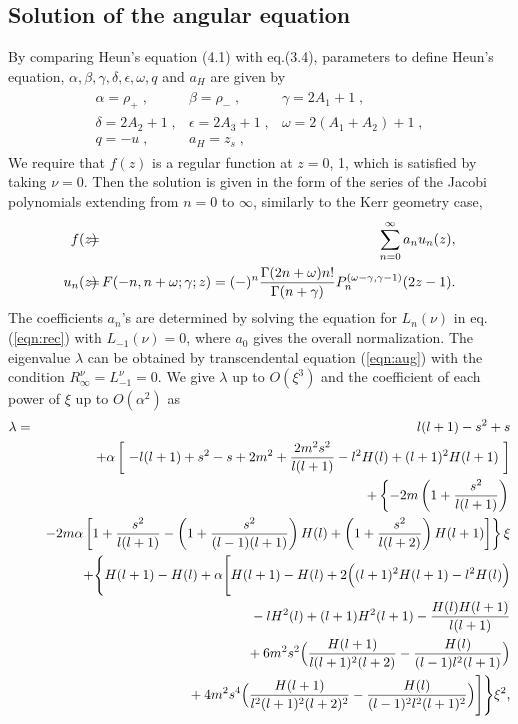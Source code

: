 \subsection{Solution of the angular equation} 
By comparing Heun's equation (4.1) with eq.(3.4), parameters to 
define Heun's equation, $\alpha, \beta, \gamma, 
\delta, \epsilon, \omega,  q$ and $a_H$ are given by
%
\begin{eqnarray}
\label{eqn:Sexp}
\begin{array}{lll}
\alpha=\rho_+\;,  & \beta=\rho_-\;,&\gamma=2A_1+1\;,   \\
 \delta = 2A_2+1\;, & \epsilon = 2A_3+1\;, &\omega=2(A_1+A_2)+1\;,\\
q= -u\;, & a_H = z_s\;,&  
\end{array}
\end{eqnarray}
%
We require that $f(z)$ is a regular function at $z=0$, 1, 
which is satisfied by taking $\nu=0$. 
Then the solution  is given in the form of 
the series of the Jacobi polynomials extending from $n=0$ to $\infty$, 
similarly to the Kerr geometry case, 
%
\begin{eqnarray} f(z) \makebox[-3mm]{}&=&\makebox[-3mm]{} 
\sum_{n=0}^{\infty} a_n u_n(z), \\ u_n(z) \makebox[-3mm]{}
&=&\makebox[-3mm]{} F(-n,n+\omega;\gamma;z) 
= (-)^n \frac{\Gamma(2n+\omega)n!}{\Gamma(n+\gamma)} 
P^{(\omega-\gamma,\gamma-1)}_n (2z-1).
\end{eqnarray}
%
The coefficients $a_n$'s are determined by solving the equation 
for $L_n(\nu)$ in eq.(\ref{eqn:rec})  with $L_{-1}(\nu)=0$, where 
$a_0$ gives the overall normalization. 
The eigenvalue $\lambda$ can be obtained by transcendental equation 
(\ref{eqn:aug}) with the condition $R_{\infty}^{\nu}=L_{-1}^{\nu}=0$. 
We give $\lambda$ up to $O(\xi^3)$ and the coefficient of each power of $\xi$ 
up to $O(\alpha^2)$ 
as 
%
\begin{eqnarray}
\lambda &=&
l(l+1)-s^2+s \nonumber \\
&& +\alpha\left[ \ -l(l+1)+s^2-s+2m^2+
\frac{2m^2s^2}{l(l+1)}-l^2 H(l)+(l+1)^2H(l+1) \ \right] \nonumber \\ && 
+\left\{-2m\left(1+\frac{s^2}{l(l+1)}\right) \right. \nonumber \\ && \left.
- 2m\alpha\left[1+\frac{s^2}{l(l+1)}
-\left(1+\frac{s^2}{(l-1)(l+1)}\right)H(l)
+\left(1+\frac{s^2}{l(l+2)}\right)H(l+1)\right] 
\right\} \xi \nonumber \\ && +\Bigg\{ H(l+1)-H(l) 
+\alpha\Bigg[H(l+1)-H(l)+2\Big((l+1)^2H(l+1)-l^2H(l)\Big) 
\nonumber \\
&& \makebox[5mm]{}  
- lH^2(l)+(l+1)H^2(l+1)-\frac{H(l)H(l+1)}{l(l+1)} \nonumber \\
&& \makebox[5mm]{}
+6m^2s^2\Big(\frac{H(l+1)}{l(l+1)^2(l+2)} 
-\frac{H(l)}{(l-1)l^2(l+1)}\Big) \nonumber \\
&& \makebox[5mm]{}
+4m^2s^4\Big(\frac{H(l+1)}{l^2(l+1)^2(l+2)^2}
-\frac{H(l)}{(l-1)^2l^2(l+1)^2}\Big)
\Bigg]\Bigg\}\xi^2, 
\end{eqnarray}

